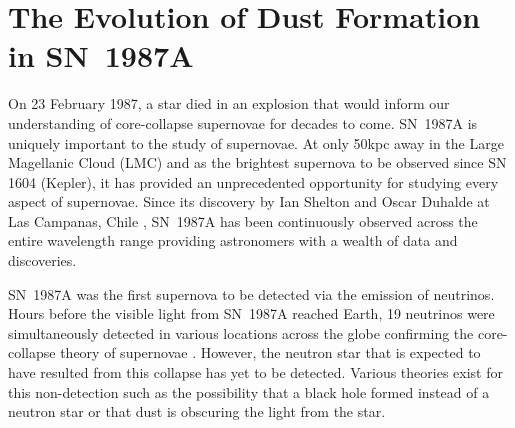 \chapter{The Evolution of Dust Formation in SN~1987A}\label{chp:chp5}

%




On 23 February 1987, a star died in an explosion that would inform our understanding of core-collapse supernovae for decades to come.  SN~1987A is uniquely important to the study of supernovae.  At only 50kpc away in the Large Magellanic Cloud (LMC) and as the brightest supernova to be observed since SN 1604 (Kepler), it has provided an unprecedented opportunity for studying every aspect of supernovae.  Since its discovery by Ian Shelton and Oscar Duhalde at Las Campanas, Chile \citep{Kunkel1987}, SN~1987A has been continuously observed across the entire wavelength range providing astronomers with a wealth of data and discoveries.  

SN~1987A was the first supernova to be detected via the emission of neutrinos.  Hours before the visible light from SN~1987A reached Earth, 19 neutrinos were simultaneously detected in various locations across the globe confirming the core-collapse theory of supernovae \citep{Bionta1987,Hirata1987}.  However, the neutron star that is expected to have resulted from this collapse has yet to be detected.  Various theories exist for this non-detection such as the possibility that a black hole formed instead of a neutron star or that dust is obscuring the light from the star.


